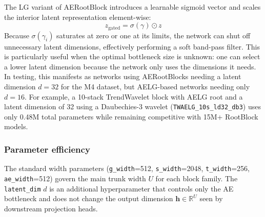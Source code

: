 \documentclass[11pt,a4paper]{article}
\begin{document}
The LG variant of AERootBlock introduces a learnable sigmoid vector and scales the interior latent representation element-wise:
\begin{equation*}
z_{\text{gated}} = \sigma(\gamma) \odot z
\end{equation*}
Because $\sigma(\gamma_i)$ saturates at zero or one at its limits, the network can shut off unnecessary latent dimensions, effectively performing a soft band-pass filter. This is particularly useful when the optimal bottleneck size is unknown: one can select a lower latent dimension because the network only uses the dimensions it needs. In testing, this manifests as networks using AERootBlocks needing a latent dimension $d = 32$ for the M4 dataset, but AELG-based networks needing only $d = 16$. For example, a 10-stack TrendWavelet block with AELG root and a latent dimension of 32 using a Daubechies-3 wavelet (\texttt{TWAELG\_10s\_ld32\_db3}) uses only 0.48M total parameters while remaining competitive with 15M+ RootBlock models.

\begin{table}
  \caption{Backbone architecture comparison.}
  \label{tab:backbones}
  \centering
\end{table}

\subsubsection{Parameter efficiency}

The standard width parameters (\texttt{g\_width}=512, \texttt{s\_width}=2048, \texttt{t\_width}=256, \texttt{ae\_width}=512) govern the main trunk width $U$ for each block family. The \texttt{latent\_dim} $d$ is an additional hyperparameter that controls only the AE bottleneck and does not change the output dimension $\mathbf{h} \in \mathbb{R}^U$ seen by downstream projection heads.
\end{document}
